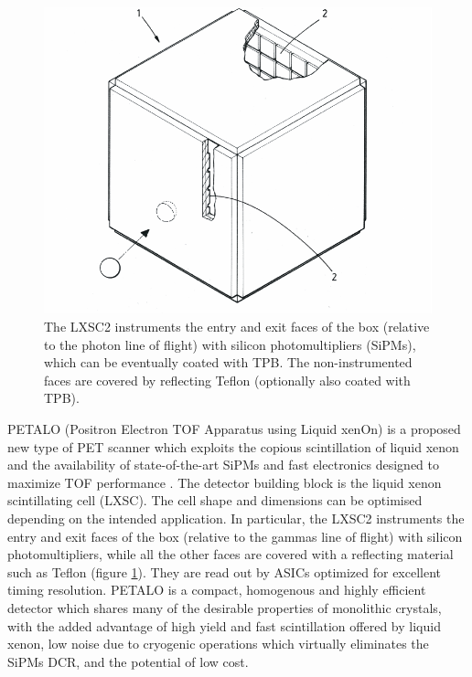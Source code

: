 \documentclass[review]{elsarticle}
\begin{document}
\begin{figure}[!htbp]
	\centering
	\includegraphics[scale=0.6]{../img/LXSC2.pdf}
	\caption{The LXSC2 instruments the entry and exit faces of the box (relative to the photon line of flight) with silicon photomultipliers (SiPMs), which can be eventually coated with TPB. The non-instrumented faces are covered by reflecting Teflon (optionally also coated with TPB).}\label{fig.box} 
\end{figure}

PETALO (Positron Electron TOF Apparatus using Liquid xenOn) is a proposed new type of PET scanner which exploits the copious scintillation of liquid xenon and the availability of state-of-the-art SiPMs and fast electronics designed to maximize TOF performance \cite{Petalo2015}. The detector building block is the liquid xenon scintillating cell (LXSC). The cell shape and dimensions can be optimised depending on the intended application. In particular, the LXSC2 instruments the entry and exit faces of the box (relative to the gammas line of flight) with silicon photomultipliers, while all the other faces are covered with a reflecting material such as Teflon (figure \ref{fig.box}). They are read out by ASICs optimized for excellent timing resolution. PETALO is a compact, homogenous and highly efficient detector which shares many of the desirable properties of monolithic crystals, with the added advantage of high yield and fast scintillation offered by liquid xenon, low noise due to cryogenic operations which virtually eliminates the SiPMs DCR, and the potential of low cost. 
\end{document}
